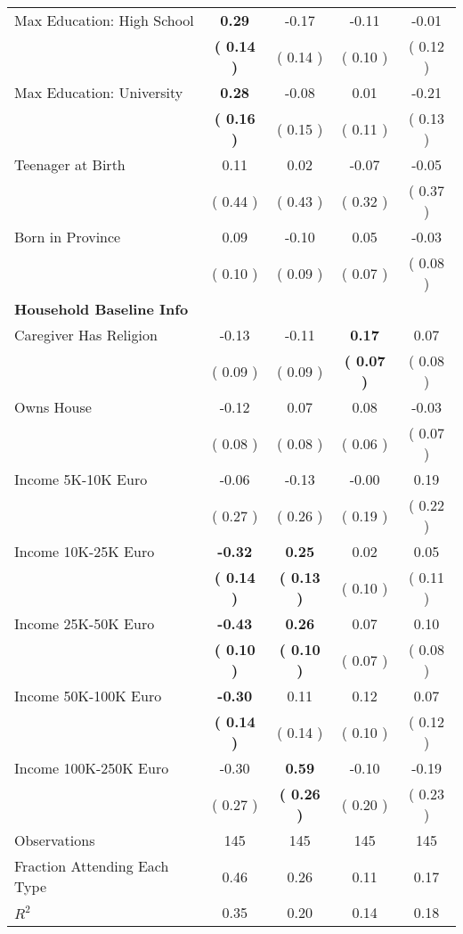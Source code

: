 \begin{table}[H]
{\begin{tabular}{lcccc}
\quad Max Education: High School & \textbf{     0.29} &     -0.17 &     -0.11 &     -0.01 \\
\quad  & \textbf{(     0.14 )} & (     0.14 )  & (     0.10 )  & (     0.12 )  \\
\quad Max Education: University & \textbf{     0.28} &     -0.08 &      0.01 &     -0.21 \\
\quad  & \textbf{(     0.16 )} & (     0.15 )  & (     0.11 )  & (     0.13 )  \\
\quad Teenager at Birth &      0.11 &      0.02 &     -0.07 &     -0.05 \\
\quad  & (     0.44 ) & (     0.43 )  & (     0.32 )  & (     0.37 )  \\
\quad Born in Province &      0.09 &     -0.10 &      0.05 &     -0.03 \\
\quad  & (     0.10 ) & (     0.09 )  & (     0.07 )  & (     0.08 )  \\
\midrule
\textbf{Household Baseline Info} \\
\quad Caregiver Has Religion &     -0.13 &     -0.11 & \textbf{     0.17} &      0.07 \\
\quad  & (     0.09 ) & (     0.09 )  & \textbf{(     0.07 )}  & (     0.08 )  \\
\quad Owns House &     -0.12 &      0.07 &      0.08 &     -0.03 \\
\quad  & (     0.08 ) & (     0.08 )  & (     0.06 )  & (     0.07 )  \\
\quad Income 5K-10K Euro &     -0.06 &     -0.13 &     -0.00 &      0.19 \\
\quad  & (     0.27 ) & (     0.26 )  & (     0.19 )  & (     0.22 )  \\
\quad Income 10K-25K Euro & \textbf{    -0.32} & \textbf{     0.25} &      0.02 &      0.05 \\
\quad  & \textbf{(     0.14 )} & \textbf{(     0.13 )}  & (     0.10 )  & (     0.11 )  \\
\quad Income 25K-50K Euro & \textbf{    -0.43} & \textbf{     0.26} &      0.07 &      0.10 \\
\quad  & \textbf{(     0.10 )} & \textbf{(     0.10 )}  & (     0.07 )  & (     0.08 )  \\
\quad Income 50K-100K Euro & \textbf{    -0.30} &      0.11 &      0.12 &      0.07 \\
\quad  & \textbf{(     0.14 )} & (     0.14 )  & (     0.10 )  & (     0.12 )  \\
\quad Income 100K-250K Euro &     -0.30 & \textbf{     0.59} &     -0.10 &     -0.19 \\
\quad  & (     0.27 ) & \textbf{(     0.26 )}  & (     0.20 )  & (     0.23 )  \\
\midrule
Observations & 145 & 145 & 145 & 145 \\
Fraction Attending Each Type &      0.46 &      0.26 &      0.11 &      0.17 \\
\midrule
$ R^2$ &      0.35 &      0.20 &      0.14 &      0.18 \\
\bottomrule
\end{tabular}}
\end{table}
